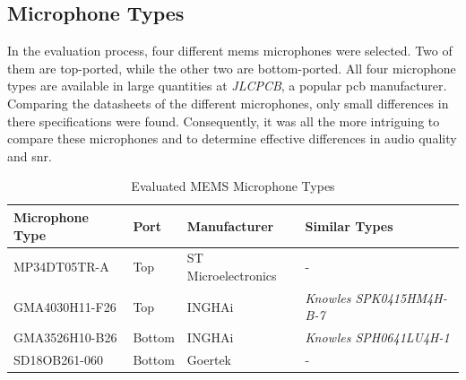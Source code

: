 \subsection{Microphone Types}
In the evaluation process, four different \acrshort{mems} microphones were selected.
Two of them are top-ported, while the other two are bottom-ported.
All four microphone types are available in large quantities at \textit{JLCPCB}, a popular \acrshort{pcb} manufacturer.
Comparing the datasheets of the different microphones, only small differences in there specifications were found.
Consequently, it was all the more intriguing to compare these microphones and to determine effective differences in audio quality and \acrfull{snr}.

\begin{table}[h]
	\centering
	\small
	\begin{tabular}{ l l l l}
		\textbf{Microphone Type} & \textbf{Port} & \textbf{Manufacturer} & \textbf{Similar Types} \vspace{0.1cm} \\
		\hline
		MP34DT05TR-A             & Top           & ST Microelectronics   & -                                     \\
		\hline
		GMA4030H11-F26           & Top           & INGHAi                & \textit{Knowles SPK0415HM4H-B-7}      \\
		\hline
		GMA3526H10-B26           & Bottom        & INGHAi                & \textit{Knowles SPH0641LU4H-1}        \\
		\hline
		SD18OB261-060            & Bottom        & Goertek               & -                                     \\
		\hline
	\end{tabular}
	\caption{Evaluated MEMS Microphone Types}
	\label{tab:mems_microphones}
\end{table}

